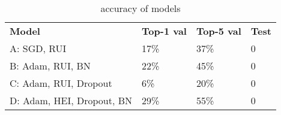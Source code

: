 

\begin{table}[htbp]
\begin{center}
\begin{tabular}{|l|l|l|l|}
\cline{1-4}
\textbf{Model} & \textbf{Top-1 val} & \textbf{Top-5 val} & \textbf{Test}  \\
\cline{1-4}
          A: SGD, RUI                &   17\%  		  &  37\%	      & 0\\
          B: Adam, RUI, BN           &   22\%  		  &  45\%	      & 0\\
          C: Adam, RUI, Dropout      &   6\%      	&  20\%       & 0\\
          D: Adam, HEI, Dropout, BN  &   29\%  	    &  55\% 	    &	0\\

\cline{1-4}
\end{tabular}
\caption[]
{\small
accuracy of models
}
\label{table:accuracy}
\end{center}
\end{table}
